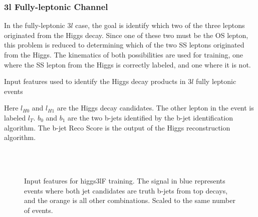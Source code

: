 
\subsubsection{3l Fully-leptonic Channel}
\label{subsec:higgs3lF}

In the fully-leptonic $3l$  case, the goal is identify which two of the three leptons originated from the Higgs decay. Since one of these two must be the OS lepton, this problem is reduced to determining which of the two SS leptons originated from the Higgs. The kinematics of both possibilities are used for training, one where the SS lepton from the Higgs is correctly labeled, and one where it is not.

\begin{table}[H]

  \caption{Input features used to identify the Higgs decay products in $3l$  fully leptonic events}
  \label{tab:higgsTop3lFfeatures}
\end{table}

Here $l_{H0}$ and $l_{H1}$ are the Higgs decay candidates. The other lepton in the event is labeled $l_T$. $b_0$ and $b_1$ are the two b-jets identified by the b-jet identification algorithm. The b-jet Reco Score is the output of the Higgs reconstruction algorithm. 

\begin{figure}[H]
    \centering
    \\
    \\
    \caption{Input features for higgs3lF training. The signal in blue represents events where both jet candidates are truth b-jets from top decays, and the orange is all other combinations. Scaled to the same number of events.}
    \label{fig:features_higgs3lF}
\end{figure}

